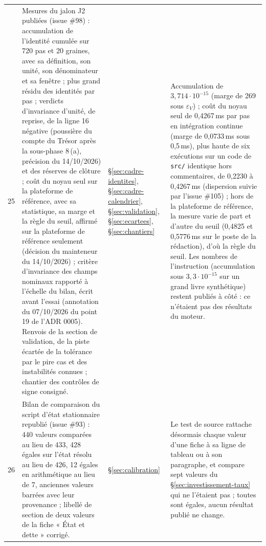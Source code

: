 \documentclass[11pt,a4paper]{article}
\begin{document}
\begin{center}
\begin{longtable}{p{0.5cm}>{\raggedright\arraybackslash}p{6.3cm}>{\raggedright\arraybackslash}p{2.1cm}>{\raggedright\arraybackslash}p{5.8cm}}
25 & Mesures du jalon J2 publiées (issue \#98) : accumulation de l'identité cumulée sur 720 pas et 20 graines, avec sa définition, son unité, son dénominateur et sa fenêtre ; plus grand résidu des identités par pas ; verdicts d'invariance d'unité, de reprise, de la ligne 16 négative (poussière du compte du Trésor après la sous-phase 8\,(a), précision du 14/10/2026) et des réserves de clôture ; coût du noyau seul sur la plateforme de référence, avec sa statistique, sa marge et la règle du seuil, affirmé sur la plateforme de référence seulement (décision du mainteneur du 14/10/2026) ; critère d'invariance des champs nominaux rapporté à l'échelle du bilan, écrit avant l'essai (annotation du 07/10/2026 du point 19 de l'ADR 0005). Renvois de la section de validation, de la piste écartée de la tolérance par le pire cas et des instabilités connues ; chantier des contrôles de signe consigné. & \S\ref{sec:cadre-identites}, \S\ref{sec:cadre-calendrier}, \S\ref{sec:validation}, \S\ref{sec:ecartees}, \S\ref{sec:chantiers} & Accumulation de $3{,}714 \cdot 10^{-15}$ (marge de 269 sous $\varepsilon_V$) ; coût du noyau seul de 0,4267\,ms par pas en intégration continue (marge de 0,0733\,ms sous 0,5\,ms), plus haute de six exécutions sur un code de \nolinkurl{src/} identique hors commentaires, de 0,2230 à 0,4267\,ms (dispersion suivie par l'issue \#105) ; hors de la plateforme de référence, la mesure varie de part et d'autre du seuil (0,4825 et 0,5776\,ms sur le poste de la rédaction), d'où la règle du seuil. Les nombres de l'instruction (accumulation sous $3{,}3 \cdot 10^{-15}$ sur un grand livre synthétique) restent publiés à côté : ce n'étaient pas des résultats du moteur.\\
26 & Bilan de comparaison du script d'état stationnaire republié (issue \#93) : 440 valeurs comparées au lieu de 433, 428 égales sur l'état résolu au lieu de 426, 12 égales en arithmétique au lieu de 7, anciennes valeurs barrées avec leur provenance ; libellé de section de deux valeurs de la fiche « État et dette » corrigé. & \S\ref{sec:calibration} & Le test de source rattache désormais chaque valeur d'une fiche à sa ligne de tableau ou à son paragraphe, et compare sept valeurs du \S\ref{sec:investissement-taux} qui ne l'étaient pas ; toutes sont égales, aucun résultat publié ne change.\\

\end{longtable}
\end{center}
\end{document}
